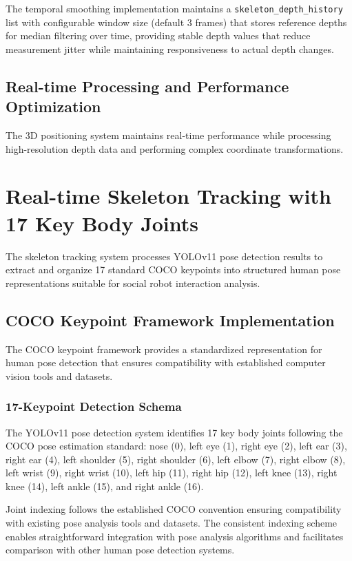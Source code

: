 The temporal smoothing implementation maintains a \texttt{skeleton\_depth\_history} list with configurable window size (default 3 frames) that stores reference depths for median filtering over time, providing stable depth values that reduce measurement jitter while maintaining responsiveness to actual depth changes.

\subsection{Real-time Processing and Performance Optimization}

The 3D positioning system maintains real-time performance while processing high-resolution depth data and performing complex coordinate transformations.



\section{Real-time Skeleton Tracking with 17 Key Body Joints}

The skeleton tracking system processes YOLOv11 pose detection results to extract and organize 17 standard COCO keypoints into structured human pose representations suitable for social robot interaction analysis.

\subsection{COCO Keypoint Framework Implementation}

The COCO keypoint framework provides a standardized representation for human pose detection that ensures compatibility with established computer vision tools and datasets.

\subsubsection{17-Keypoint Detection Schema}

The YOLOv11 pose detection system identifies 17 key body joints following the COCO pose estimation standard: nose (0), left eye (1), right eye (2), left ear (3), right ear (4), left shoulder (5), right shoulder (6), left elbow (7), right elbow (8), left wrist (9), right wrist (10), left hip (11), right hip (12), left knee (13), right knee (14), left ankle (15), and right ankle (16).

Joint indexing follows the established COCO convention ensuring compatibility with existing pose analysis tools and datasets. The consistent indexing scheme enables straightforward integration with pose analysis algorithms and facilitates comparison with other human pose detection systems.

